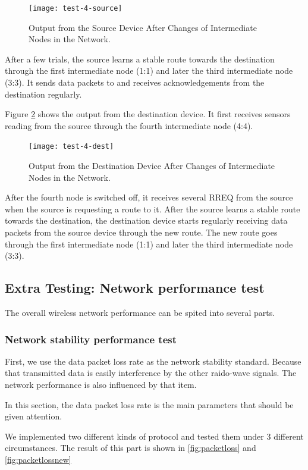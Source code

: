 \begin{figure}
\centering
\texttt{[image: test-4-source]}
\caption{Output from the Source Device After Changes of Intermediate Nodes in the Network.}
\label{fig:test-4-source}
\end{figure}


After a few trials, the source learns a stable route towards the destination through the first intermediate node (1:1) and later the third intermediate node (3:3).
It sends data packets to and receives acknowledgements from the destination regularly.

Figure \ref{fig:test-4-dest} shows the output from the destination device.
It first receives sensors reading from the source through the fourth intermediate node (4:4). 

\begin{figure}
\centering
\texttt{[image: test-4-dest]}
\caption{Output from the Destination Device After Changes of Intermediate Nodes in the Network.}
\label{fig:test-4-dest}
\end{figure}

After the fourth node is switched off, it receives several RREQ from the source when the source is requesting a route to it.
After the source learns a stable route towards the destination, the destination device starts regularly receiving data packets from the source device through the new route.
The new route goes through the first intermediate node (1:1) and later the third intermediate node (3:3).

\subsection{Extra Testing: Network performance test}

The overall wireless network performance can be spited into several parts.

\subsubsection{Network stability performance test}

First, we use the data packet loss rate as the network stability standard. Because that transmitted data is easily interference by the other raido-wave signals. The network performance is also influenced by that item.

In this section, the data packet loss rate is the main parameters that should be given attention.

We implemented two different kinds of protocol and tested them under 3 different circumstances. The result of this part is shown in \ref{fig:packetloss} and \ref{fig:packetlossnew}

